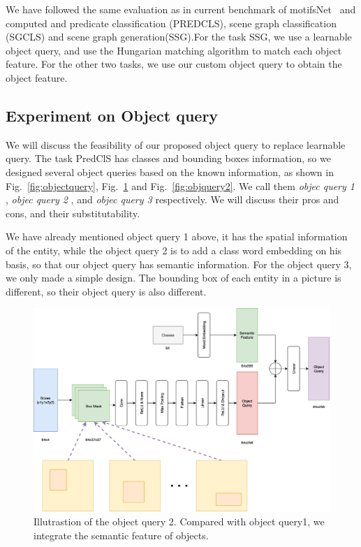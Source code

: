 We have followed the same evaluation as in current benchmark of motifsNet~\cite{zellers2018neural} and computed and predicate classification (PREDCLS), scene graph classification (SGCLS) and scene graph generation(SSG).For the task SSG, we use a learnable object query, and use the Hungarian matching algorithm to match each object feature. For the other two tasks, we use our custom object query to obtain the object feature.


\subsection{Experiment on Object query}

We will discuss the feasibility of our proposed object query to replace learnable query. The task PredClS has classes and bounding boxes information, so we designed several object queries based on the known information, as shown in Fig.~\ref{fig:objectquery}, Fig.~\ref{fig:objquery1} and Fig.~\ref{fig:objquery2}. We call them  \textit{objec query 1} ,  \textit{objec query 2} , and  \textit{objec query 3}  respectively. We will discuss their pros and cons, and their substitutability.

We have already mentioned object query 1 above, it has the spatial information of the entity, while the object query 2 is to add a class word embedding on his basis, so that our object query has semantic information. For the object query 3, we only made a simple design. The bounding box of each entity in a picture is different, so their object query is also different.

\begin{figure}[tbph!]
	\centering
	\includegraphics[width=0.9\linewidth]{figures/obj_query1}
	\caption[Illutrastion of the object query 2]{Illutrastion of the object query 2. Compared with object query1, we integrate the semantic feature of objects.}
	\label{fig:objquery1}
\end{figure}

